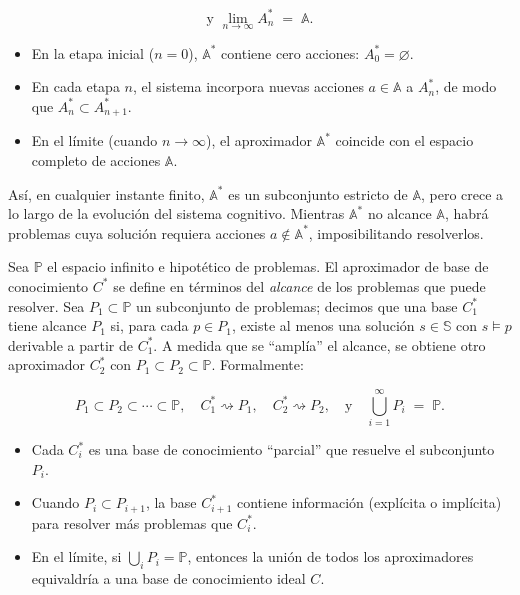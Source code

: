 \begin{equation}
 \text{y } \lim_{n \to \infty} A_n^* \;=\; \mathbb{A}.
\end{equation}

\begin{itemize}
 \item En la etapa inicial ($n = 0$), \(\mathbb{A}^*\) contiene
cero acciones: \(A_0^* = \varnothing\).
 \item En cada etapa \(n\), el sistema
incorpora nuevas acciones \(a \in \mathbb{A}\) a \(A_{n}^*\), de modo que
\(A_n^* \subset A_{n+1}^*\).
 \item En el límite (cuando \(n \to \infty\)), el
aproximador \(\mathbb{A}^*\) coincide con el espacio completo de acciones
\(\mathbb{A}\).
 \end{itemize}

Así, en cualquier instante finito, \(\mathbb{A}^*\) es un subconjunto estricto
de \(\mathbb{A}\), pero crece a lo largo de la evolución del sistema cognitivo.
Mientras \(\mathbb{A}^*\) no alcance \(\mathbb{A}\), habrá problemas cuya
solución requiera acciones \(a \notin \mathbb{A}^*\), imposibilitando
resolverlos.


Sea \(\mathbb{P}\) el espacio infinito e hipotético de problemas. El aproximador
de base de conocimiento \(C^*\) se define en términos del \emph{alcance} de los
problemas que puede resolver. Sea \(P_1 \subset \mathbb{P}\) un subconjunto de
problemas; decimos que una base \(C_1^*\) tiene alcance \(P_1\) si, para cada
\(p \in P_1\), existe al menos una solución \(s\in \mathbb{S}\) con \(s \models
p\) derivable a partir de \(C_1^*\). A medida que se “amplía” el alcance, se
obtiene otro aproximador \(C_2^*\) con \(P_1 \subset P_2 \subset \mathbb{P}\).
Formalmente:

\begin{equation}
 P_1 \subset P_2 \subset \cdots \subset \mathbb{P}, 
 \quad
 C_1^*
\rightsquigarrow P_1, 
 \quad
 C_2^* \rightsquigarrow P_2,
 \quad
 \text{y}\quad
\bigcup_{i=1}^{\infty} P_i \;=\; \mathbb{P}.
\end{equation}

\begin{itemize}
 \item Cada \(C_i^*\) es una base de conocimiento “parcial” que
resuelve el subconjunto \(P_i\).
 \item Cuando \(P_{i} \subset P_{i+1}\), la
base \(C_{i+1}^*\) contiene información (explícita o implícita) para resolver
más problemas que \(C_i^*\).
 \item En el límite, si \(\bigcup_i P_i =
\mathbb{P}\), entonces la unión de todos los aproximadores equivaldría a una
base de conocimiento ideal \(C\).
 \end{itemize}

